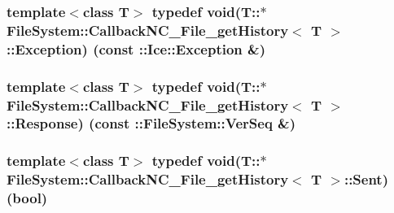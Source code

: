 \subsubsection[{Exception}]{\setlength{\rightskip}{0pt plus 5cm}template$<$class T$>$ typedef void(T\+::$\ast$ {\bf File\+System\+::\+Callback\+N\+C\+\_\+\+File\+\_\+get\+History}$<$ T $>$\+::Exception) (const \+::Ice\+::\+Exception \&)}\label{class_file_system_1_1_callback_n_c___file__get_history_a828dbde2a7dd89e32a5e98ea6a92c9a7}
\hypertarget{class_file_system_1_1_callback_n_c___file__get_history_a7fef6c01133235ae7b604366d356eae4}{}
\subsubsection[{Response}]{\setlength{\rightskip}{0pt plus 5cm}template$<$class T$>$ typedef void(T\+::$\ast$ {\bf File\+System\+::\+Callback\+N\+C\+\_\+\+File\+\_\+get\+History}$<$ T $>$\+::Response) (const \+::{\bf File\+System\+::\+Ver\+Seq} \&)}\label{class_file_system_1_1_callback_n_c___file__get_history_a7fef6c01133235ae7b604366d356eae4}
\hypertarget{class_file_system_1_1_callback_n_c___file__get_history_a9e909ff9b45d83e890c037566c529f6e}{}
\subsubsection[{Sent}]{\setlength{\rightskip}{0pt plus 5cm}template$<$class T$>$ typedef void(T\+::$\ast$ {\bf File\+System\+::\+Callback\+N\+C\+\_\+\+File\+\_\+get\+History}$<$ T $>$\+::Sent) (bool)}\label{class_file_system_1_1_callback_n_c___file__get_history_a9e909ff9b45d83e890c037566c529f6e}
\hypertarget{class_file_system_1_1_callback_n_c___file__get_history_ae005e81d63a5bdcf9b9aafc40a28ff6b}{}

